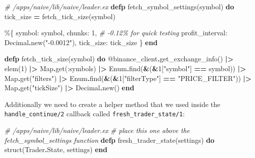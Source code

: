 \documentclass[
]{book}
\newenvironment{Shaded}{\begin{snugshade}}{\end{snugshade}}
\newcommand{\CommentTok}[1]{\textcolor[rgb]{0.56,0.35,0.01}{\textit{#1}}}
\newcommand{\ConstantTok}[1]{\textcolor[rgb]{0.00,0.00,0.00}{#1}}
\newcommand{\DecValTok}[1]{\textcolor[rgb]{0.00,0.00,0.81}{#1}}
\newcommand{\KeywordTok}[1]{\textcolor[rgb]{0.13,0.29,0.53}{\textbf{#1}}}
\newcommand{\NormalTok}[1]{#1}
\newcommand{\OperatorTok}[1]{\textcolor[rgb]{0.81,0.36,0.00}{\textbf{#1}}}
\newcommand{\OtherTok}[1]{\textcolor[rgb]{0.56,0.35,0.01}{#1}}
\newcommand{\StringTok}[1]{\textcolor[rgb]{0.31,0.60,0.02}{#1}}
\newcommand{\VariableTok}[1]{\textcolor[rgb]{0.00,0.00,0.00}{#1}}
\begin{document}
\begin{Shaded}
\begin{Highlighting}[]
  \CommentTok{\# /apps/naive/lib/naive/leader.ex}
  \KeywordTok{defp}\NormalTok{ fetch\_symbol\_settings(symbol) }\KeywordTok{do}
\NormalTok{    tick\_size }\OperatorTok{=}\NormalTok{ fetch\_tick\_size(symbol)}

\NormalTok{    \%\{}
      \VariableTok{symbol:}\NormalTok{ symbol,}
      \VariableTok{chunks:} \DecValTok{1}\NormalTok{,}
      \CommentTok{\# {-}0.12\% for quick testing}
      \VariableTok{profit\_interval:} \ConstantTok{Decimal}\OperatorTok{.}\NormalTok{new(}\StringTok{"{-}0.0012"}\NormalTok{),}
      \VariableTok{tick\_size:}\NormalTok{ tick\_size}
\NormalTok{    \}}
  \KeywordTok{end}

  \KeywordTok{defp}\NormalTok{ fetch\_tick\_size(symbol) }\KeywordTok{do}
    \OtherTok{@binance\_client}\OperatorTok{.}\NormalTok{get\_exchange\_info()}
    \OperatorTok{|\textgreater{}}\NormalTok{ elem(}\DecValTok{1}\NormalTok{)}
    \OperatorTok{|\textgreater{}} \ConstantTok{Map}\OperatorTok{.}\NormalTok{get(}\VariableTok{:symbols}\NormalTok{)}
    \OperatorTok{|\textgreater{}} \ConstantTok{Enum}\OperatorTok{.}\NormalTok{find(}\OperatorTok{\&}\NormalTok{(}\OperatorTok{\&}\DecValTok{1}\NormalTok{[}\StringTok{"symbol"}\NormalTok{] }\OperatorTok{==}\NormalTok{ symbol))}
    \OperatorTok{|\textgreater{}} \ConstantTok{Map}\OperatorTok{.}\NormalTok{get(}\StringTok{"filters"}\NormalTok{)}
    \OperatorTok{|\textgreater{}} \ConstantTok{Enum}\OperatorTok{.}\NormalTok{find(}\OperatorTok{\&}\NormalTok{(}\OperatorTok{\&}\DecValTok{1}\NormalTok{[}\StringTok{"filterType"}\NormalTok{] }\OperatorTok{==} \StringTok{"PRICE\_FILTER"}\NormalTok{))}
    \OperatorTok{|\textgreater{}} \ConstantTok{Map}\OperatorTok{.}\NormalTok{get(}\StringTok{"tickSize"}\NormalTok{)}
    \OperatorTok{|\textgreater{}} \ConstantTok{Decimal}\OperatorTok{.}\NormalTok{new()}
  \KeywordTok{end}
\end{Highlighting}
\end{Shaded}

Additionally we need to create a helper method that we used inside the \texttt{handle\_continue/2} callback called \texttt{fresh\_trader\_state/1}:

\begin{Shaded}
\begin{Highlighting}[]
  \CommentTok{\# /apps/naive/lib/naive/leader.ex}
  \CommentTok{\# place this one above the \textasciigrave{}fetch\_symbol\_settings\textasciigrave{} function}
  \KeywordTok{defp}\NormalTok{ fresh\_trader\_state(settings) }\KeywordTok{do}
\NormalTok{    struct(}\ConstantTok{Trader}\OperatorTok{.}\ConstantTok{State}\NormalTok{, settings)}
  \KeywordTok{end}
\end{Highlighting}
\end{Shaded}
\end{document}
